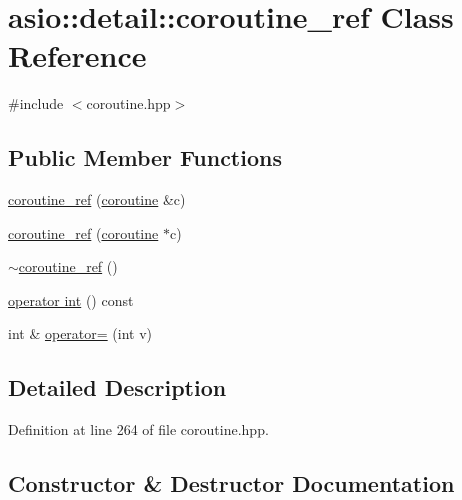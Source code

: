 \hypertarget{classasio_1_1detail_1_1coroutine__ref}{}\section{asio\+:\+:detail\+:\+:coroutine\+\_\+ref Class Reference}
\label{classasio_1_1detail_1_1coroutine__ref}


{\ttfamily \#include $<$coroutine.\+hpp$>$}

\subsection*{Public Member Functions}
\begin{DoxyCompactItemize}
\item 
\hyperlink{classasio_1_1detail_1_1coroutine__ref_af01f176cfd70c484c619cbbdb34fd53b}{coroutine\+\_\+ref} (\hyperlink{classasio_1_1coroutine}{coroutine} \&c)
\item 
\hyperlink{classasio_1_1detail_1_1coroutine__ref_a6f12bcc1f0a2317f2239e4ccd3eb7672}{coroutine\+\_\+ref} (\hyperlink{classasio_1_1coroutine}{coroutine} $\ast$c)
\item 
\hyperlink{classasio_1_1detail_1_1coroutine__ref_a262fe205ffdb857ef88693fcce064457}{$\sim$coroutine\+\_\+ref} ()
\item 
\hyperlink{classasio_1_1detail_1_1coroutine__ref_abcfea713c212531544bd6835926a9244}{operator int} () const 
\item 
int \& \hyperlink{classasio_1_1detail_1_1coroutine__ref_ab52fbe1cebb26be24cbecf98ae2e48b1}{operator=} (int v)
\end{DoxyCompactItemize}


\subsection{Detailed Description}


Definition at line 264 of file coroutine.\+hpp.



\subsection{Constructor \& Destructor Documentation}
\hypertarget{classasio_1_1detail_1_1coroutine__ref_af01f176cfd70c484c619cbbdb34fd53b}{}
